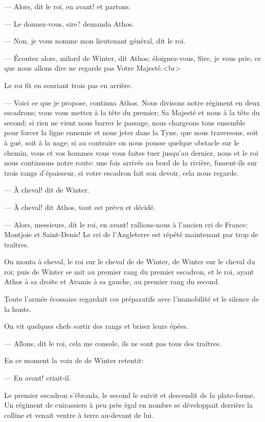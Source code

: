 — Alors, dit le roi, en avant! et partons.

— Le donnez-vous, sire? demanda Athos.

— Non, je vous nomme mon lieutenant général, dit le roi.

— Écoutez alors, milord de Winter, dit Athos; éloignez-vous, Sire, je vous prie; ce que nous allons dire ne regarde pas Votre
Majesté.<br> 

Le roi fit en souriant trois pas en arrière.

— Voici ce que je propose, continua Athos. Nous divisons notre régiment en deux escadrons; vous vous mettez à la tête du premier; Sa Majesté et nous à la tête du second; si rien ne vient nous barrer le passage, nous chargeons tous ensemble pour forcer la ligne ennemie et nous jeter dans la Tyne, que nous traversons, soit à gué, soit à la nage; si au contraire on nous pousse quelque obstacle sur le chemin, vous et vos hommes vous vous faites tuer jusqu'au dernier, nous et le roi nous continuons notre route: une fois arrivés au bord de la rivière, fussent-ils sur trois rangs d'épaisseur, si votre escadron fait son devoir, cela nous regarde.

— À cheval! dit de Winter.

— À cheval! dit Athos, tout est prévu et décidé.

— Alors, messieurs, dit le roi, en avant! rallions-nous à l'ancien cri de France: Montjoie et Saint-Denis! Le cri de l'Angleterre est répété maintenant par trop de traîtres.

On monta à cheval, le roi sur le cheval de de Winter, de Winter sur le cheval du roi; puis de Winter se mit au premier rang du premier escadron, et le roi, ayant Athos à sa droite et Aramis à sa gauche, au premier rang du second.

Toute l'armée écossaise regardait ces préparatifs avec l'immobilité et le silence de la honte.

On vit quelques chefs sortir des rangs et briser leurs épées.

— Allons, dit le roi, cela me console, ils ne sont pas tous des traîtres.

En ce moment la voix de de Winter retentit:

— En avant! criait-il.

Le premier escadron s'ébranla, le second le suivit et descendit de la plate-forme. Un régiment de cuirassiers à peu près égal en nombre se développait derrière la colline et venait ventre à terre au-devant de lui.

